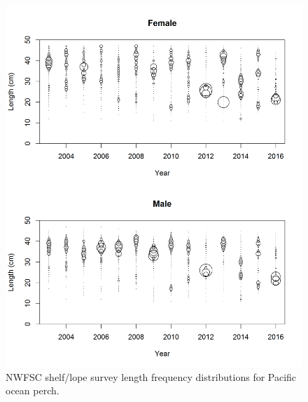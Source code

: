 \documentclass[12pt,]{article}
\begin{document}
\begin{figure}
\centering
\includegraphics{Figures/NWFSCcombo_Lengths.png}
\caption{NWFSC shelf/lope survey length frequency distributions for
Pacific ocean perch. \label{fig:nw_Length}}
\end{figure}
\end{document}
